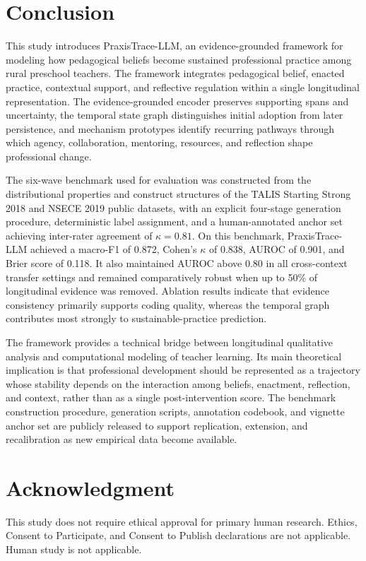 \documentclass[pdflatex,sn-mathphys-num]{sn-jnl}%
\theoremstyle{thmstyleone}%
\theoremstyle{thmstyletwo}%
\theoremstyle{thmstylethree}%
\begin{document}
\section{Conclusion}

This study introduces PraxisTrace-LLM, an evidence-grounded framework for modeling how pedagogical beliefs become sustained professional practice among rural preschool teachers. The framework integrates pedagogical belief, enacted practice, contextual support, and reflective regulation within a single longitudinal representation. The evidence-grounded encoder preserves supporting spans and uncertainty, the temporal state graph distinguishes initial adoption from later persistence, and mechanism prototypes identify recurring pathways through which agency, collaboration, mentoring, resources, and reflection shape professional change.

The six-wave benchmark used for evaluation was constructed from the distributional properties and construct structures of the TALIS Starting Strong 2018 and NSECE 2019 public datasets, with an explicit four-stage generation procedure, deterministic label assignment, and a human-annotated anchor set achieving inter-rater agreement of $\kappa = 0.81$. On this benchmark, PraxisTrace-LLM achieved a macro-F1 of 0.872, Cohen's $\kappa$ of 0.838, AUROC of 0.901, and Brier score of 0.118. It also maintained AUROC above 0.80 in all cross-context transfer settings and remained comparatively robust when up to 50\% of longitudinal evidence was removed. Ablation results indicate that evidence consistency primarily supports coding quality, whereas the temporal graph contributes most strongly to sustainable-practice prediction.

The framework provides a technical bridge between longitudinal qualitative analysis and computational modeling of teacher learning. Its main theoretical implication is that professional development should be represented as a trajectory whose stability depends on the interaction among beliefs, enactment, reflection, and context, rather than as a single post-intervention score. The benchmark construction procedure, generation scripts, annotation codebook, and vignette anchor set are publicly released to support replication, extension, and recalibration as new empirical data become available.

\section*{Acknowledgment}
This study does not require ethical approval for primary human research. Ethics, Consent to Participate, and Consent to Publish declarations are not applicable. Human study is not applicable.
\end{document}
